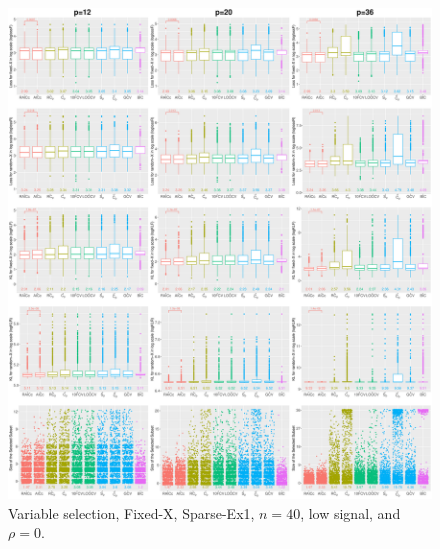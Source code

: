 \begin{figure}[!ht]
\centering
\includegraphics[width=\textwidth]{figures/supplement/fixedx/subset_selection/Sparse-Ex1_n40_lsnr_rho0.eps}
\caption{Variable selection, Fixed-X, Sparse-Ex1, $n=40$, low signal, and $\rho=0$.}
\end{figure}
\clearpage

